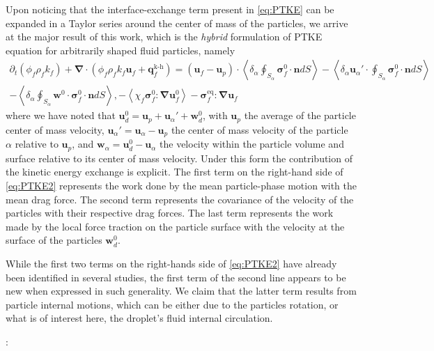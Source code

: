 \documentclass[12pt,a4paper]{article}
\newcommand{\avg}[1]{\left<#1\right>}
\renewcommand{\avg}[1]{\left<#1\right>}
\newcommand{\pavg}[1]{\avg{\delta_\alpha #1}}
\newcommand{\grad}{\mathbf{\nabla}}
\renewcommand{\div}{\mathbf{\nabla}\cdot}
\newcommand{\pddt}{\frac{\partial}{\partial t}}
\renewcommand{\pddt}{\partial_t}
\newcommand{\intS}[1]{\oint_{S_\alpha} #1 dS}
\newcommand{\pSavg}[1]{\pavg{\intS{#1}}}
\begin{document}
Upon noticing that the interface-exchange term present in \eqref{eq:PTKE} can be expanded in a Taylor series around the center of mass of the particles, we arrive at the major result of this work, which is the \textit{hybrid} formulation of PTKE equation for arbitrarily shaped fluid particles, namely
\begin{align}
    \pddt (\phi_f\rho_fk_f)  
    + \div (
        \phi_f\rho_fk_f\textbf{u}_f
        + \textbf{q}_f^\text{k-h} 
        )
    = 
    (\textbf{u}_f - \textbf{u}_p)\cdot \pSavg{{\bm{\sigma}_f^0 \cdot \textbf{n}}} 
    - \pavg{ \textbf{u}_\alpha' \cdot \intS{  \bm{\sigma}_f^0 \cdot \textbf{n}}}\nonumber\\
    - \pavg{ \intS{\textbf{w}^0 \cdot \bm{\sigma}_f^0 \cdot \textbf{n}}},
    - \avg{\chi_f\bm{\sigma}_f^0 : \grad \textbf{u}_f^0}
    - \bm{\sigma}_f^\text{eq} : \grad \textbf{u}_f
    \label{eq:PTKE2}
\end{align}
where we have noted that $\textbf{u}_d^0 = \textbf{u}_p + \textbf{u}_\alpha' +\textbf{w}_d^0$, with $\textbf{u}_p$ the average of the particle center of mass velocity, $\textbf{u}_\alpha' = \textbf{u}_\alpha - \textbf{u}_p$ the center of mass velocity of the particle $\alpha$ relative to $\textbf{u}_p$, and $\textbf{w}_\alpha = \textbf{u}_d^0 - \textbf{u}_\alpha$ the velocity within the particle volume and surface relative to its center of mass velocity. 
Under this form the contribution of the kinetic energy exchange is explicit. 
The first term on the right-hand side of \eqref{eq:PTKE2} represents the work done by the mean particle-phase motion with the mean drag force.
The second term represents the covariance of the velocity of the particles with their respective drag forces.
The last term represents the work made by the local force traction on the particle surface with the velocity at the surface of the particles $\textbf{w}_d^0$.

While the first two terms on the right-hands side of \eqref{eq:PTKE2} have already been identified in several studies, the first term of the second line appears to be new when expressed in such generality.
We claim that the latter term results from particle internal motions, which can be either due to the particles rotation, or what is of interest here, the droplet's fluid internal circulation. 

\vspace{10pt}

:
\end{document}
